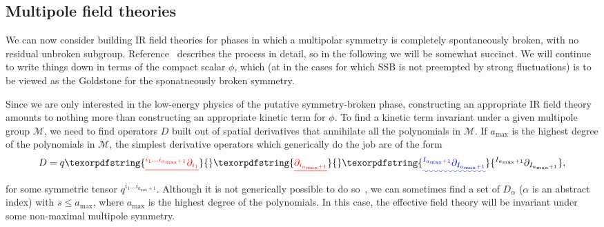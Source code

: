 \documentclass[pra,aps,twocolumn, amsfonts,amsmath,amssymb,nofootinbib,superscriptaddress]{revtex4-2}
\newcommand{\ethan}[1]{ { \color{blue} \footnotesize \textsf{ethan: \textsl{#1}} }}
\newcommand{\p}{\partial}
\providecommand{\DIFaddtex}[1]{{\protect\color{blue}\uwave{#1}}} %
\providecommand{\DIFdeltex}[1]{{\protect\color{red}\sout{#1}}}                      %
\providecommand{\DIFaddbegin}{} %
\providecommand{\DIFaddend}{} %
\providecommand{\DIFdelbegin}{} %
\providecommand{\DIFdelend}{} %
\providecommand{\DIFadd}[1]{\texorpdfstring{\DIFaddtex{#1}}{#1}} %
\providecommand{\DIFdel}[1]{\texorpdfstring{\DIFdeltex{#1}}{}} %
\newcommand{\DIFscaledelfig}{0.5}
\newlength{\DIFdelgraphicswidth} %
\newlength{\DIFdelgraphicsheight} %
\newcommand{\DIFaddincludegraphics}[2][]{{\color{blue}\fbox{\DIFOincludegraphics[#1]{#2}}}} %
\newcommand{\DIFdelincludegraphics}[2][]{%
\sbox{\DIFdelgraphicsbox}{\DIFOincludegraphics[#1]{#2}}%
\settoboxwidth{\DIFdelgraphicswidth}{\DIFdelgraphicsbox} %
\settoboxtotalheight{\DIFdelgraphicsheight}{\DIFdelgraphicsbox} %
\scalebox{\DIFscaledelfig}{%
\parbox[b]{\DIFdelgraphicswidth}{\usebox{\DIFdelgraphicsbox}\\[-\baselineskip] \rule{\DIFdelgraphicswidth}{0em}}\llap{\resizebox{\DIFdelgraphicswidth}{\DIFdelgraphicsheight}{%
\setlength{\unitlength}{\DIFdelgraphicswidth}%
\begin{picture}(1,1)%
\thicklines\linethickness{2pt} %
{\color[rgb]{1,0,0}\put(0,0){\framebox(1,1){}}}%
{\color[rgb]{1,0,0}\put(0,0){\line( 1,1){1}}}%
{\color[rgb]{1,0,0}\put(0,1){\line(1,-1){1}}}%
\end{picture}%
}\hspace*{3pt}}} %
} %
\DeclareRobustCommand{\DIFaddbegin}{\DIFOaddbegin \let\includegraphics\DIFaddincludegraphics} %
\DeclareRobustCommand{\DIFaddend}{\DIFOaddend \let\includegraphics\DIFOincludegraphics} %
\DeclareRobustCommand{\DIFdelbegin}{\DIFOdelbegin \let\includegraphics\DIFdelincludegraphics} %
\DeclareRobustCommand{\DIFdelend}{\DIFOaddend \let\includegraphics\DIFOincludegraphics} %
\begin{document}
\subsection{Multipole field theories} \label{sub:field}

We can now consider building IR field theories for phases in which a multipolar symmetry is completely spontaneously broken, with no residual unbroken subgroup. Reference~\cite{Gromov2019} describes the process in detail, so in the following we will be somewhat succinct. 
We will continue to write things down in terms of the compact scalar $\phi$, which (at in the cases for which SSB is not preempted by strong fluctuations) is to be viewed as the Goldstone for the sponatneously broken symmetry. 

Since we are only interested in the low-energy physics of the putative symmetry-broken phase, constructing an appropriate IR field theory amounts to nothing more than constructing an appropriate kinetic term for $\phi$. 
To find a kinetic term invariant under a given multipole group $\mathcal{M}$, we need to find operators $D$ built out of spatial derivatives that annihilate all the polynomials in $\mathcal{M}$. If $a_\text{max}$ is the highest degree of the polynomials in $\mathcal{M}$, the simplest derivative operators which generically do the job are of the form 
\DIFdelbegin %
\DIFdelend \begin{align}
D = q\DIFdelbegin \DIFdel{^{i_1\dots i_{a_\text{max}+1}}\partial_{i_1}}%
\DIFdel{\partial_{i_{a_\text{max}+1}}}\DIFdelend \DIFaddbegin \DIFadd{^{I_{a_{\rm max}+1}} \p_{I_{a_{\rm max}+1}}}\DIFaddend ,
\end{align}
for some symmetric tensor \DIFdelbegin \DIFdel{$q^{i_1\dots i_{a_\text{max}+1}}$}\DIFdelend \DIFaddbegin \DIFadd{$q^{I_{a_{\rm max}+1}}$}\DIFaddend . Although it is not generically possible to do so~\cite{Gromov2019}, we can sometimes find a set of $D_\alpha$ ($\alpha$ is an abstract index) with $s\le a_{\text{max}}$, where $a_\text{max}$ is the highest degree of the polynomials. In this case, the effective field theory will be invariant under some non-maximal multipole symmetry. 
\end{document}
